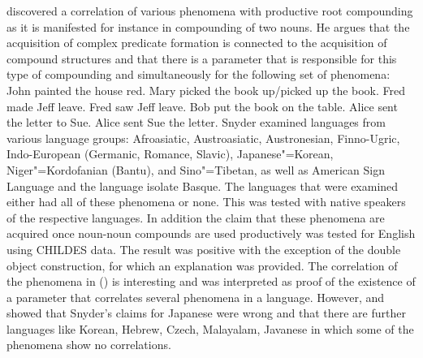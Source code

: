 \citet{Snyder2001a} discovered a correlation of various phenomena with productive root compounding
as it is manifested for instance in compounding of two nouns. He argues that the acquisition of
complex predicate formation is connected to the acquisition of compound structures and that there is
a parameter that is responsible for this type of compounding and simultaneously for the following set of
phenomena:
\eal\settowidth{}
\ex John painted the house red.                 
\ex Mary picked the book up/picked up the book. 
\ex Fred made Jeff leave.                       
\ex Fred saw Jeff leave.                        
\ex Bob put the book on the table.              
\ex Alice sent the letter to Sue.               
\ex Alice sent Sue the letter.                  
\zl 
Snyder examined languages from various language groups: Afroasiatic, Austroasiatic, Austronesian,
Finno-Ugric, Indo-European (Germanic, Romance, Slavic), Japanese"=Korean, Niger"=Kordofanian (Bantu),
and Sino"=Tibetan, as well as American Sign Language and the language isolate Basque. The languages
that were examined either had all of these phenomena or none. This was tested with native speakers
of the respective languages. In addition the claim that these phenomena are acquired once noun-noun
compounds are used productively was tested for English using CHILDES data. The result was positive
with the exception of the double object construction, for which an explanation was provided. The
correlation of the phenomena in () is interesting and was interpreted as proof of the
existence of a parameter that correlates several phenomena in a language. However, \citet{Son2007a}
and \citet{SonS2008a} showed that Snyder's claims for Japanese were wrong and that there
are further languages like Korean, Hebrew, Czech,
Malayalam, Javanese  in which some of the phenomena show no correlations. 

